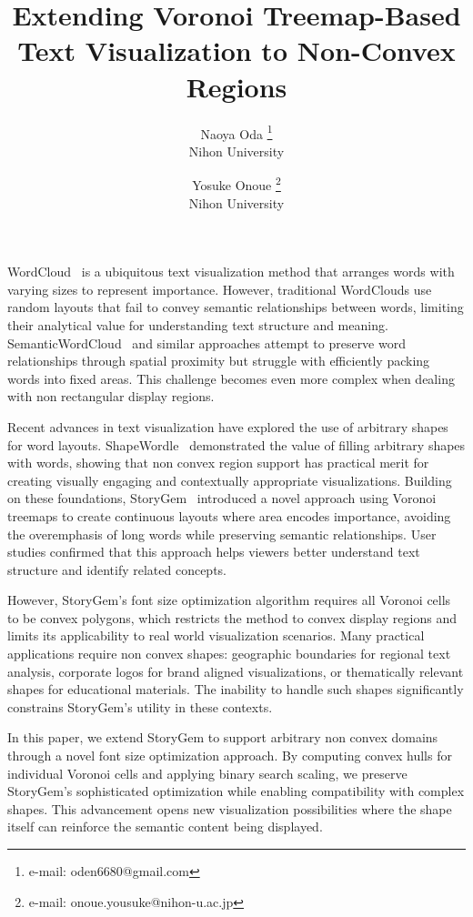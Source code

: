 \documentclass{vgtc}                          %
\title{Extending Voronoi Treemap-Based Text Visualization to Non-Convex Regions}
\author{Naoya Oda \thanks{e-mail: oden6680@gmail.com}\\ \scriptsize Nihon University %
\and Yosuke Onoue \thanks{e-mail: onoue.yousuke@nihon-u.ac.jp}\\ \scriptsize Nihon University}
\begin{document}
\maketitle

WordCloud~\cite{viegas2009participatory} is a ubiquitous text visualization method that arranges words with varying sizes to represent importance.
However, traditional WordClouds use random layouts that fail to convey semantic relationships between words, limiting their analytical value for understanding text structure and meaning.
SemanticWordCloud~\cite{wu2011semantic} and similar approaches attempt to preserve word relationships through spatial proximity but struggle with efficiently packing words into fixed areas.
This challenge becomes even more complex when dealing with non rectangular display regions.

Recent advances in text visualization have explored the use of arbitrary shapes for word layouts.
ShapeWordle~\cite{8807355} demonstrated the value of filling arbitrary shapes with words, showing that non convex region support has practical merit for creating visually engaging and contextually appropriate visualizations.
Building on these foundations, StoryGem~\cite{oda2025storygem} introduced a novel approach using Voronoi treemaps to create continuous layouts where area encodes importance, avoiding the overemphasis of long words while preserving semantic relationships.
User studies confirmed that this approach helps viewers better understand text structure and identify related concepts.

However, StoryGem's font size optimization algorithm requires all Voronoi cells to be convex polygons, which restricts the method to convex display regions and limits its applicability to real world visualization scenarios.
Many practical applications require non convex shapes: geographic boundaries for regional text analysis, corporate logos for brand aligned visualizations, or thematically relevant shapes for educational materials.
The inability to handle such shapes significantly constrains StoryGem's utility in these contexts.

In this paper, we extend StoryGem to support arbitrary non convex domains through a novel font size optimization approach.
By computing convex hulls for individual Voronoi cells and applying binary search scaling, we preserve StoryGem's sophisticated optimization while enabling compatibility with complex shapes.
This advancement opens new visualization possibilities where the shape itself can reinforce the semantic content being displayed.
\end{document}
